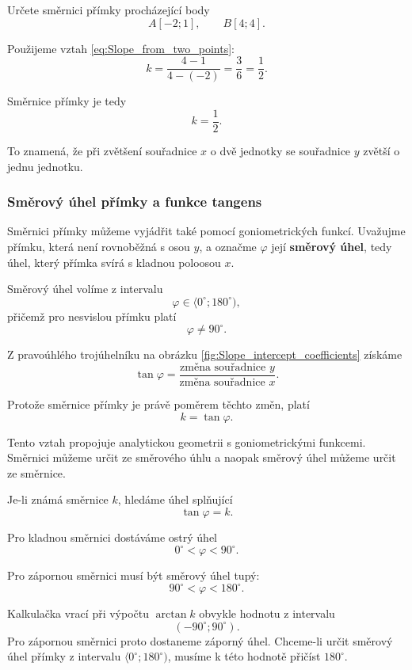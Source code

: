 \begin{example}\label{exa:Slope_from_two_points}
    Určete směrnici přímky procházející body
    \[
        A[-2;1],
        \qquad
        B[4;4].
    \]

    Použijeme vztah \eqref{eq:Slope_from_two_points}:
    \[
        k
        =
        \frac{4-1}{4-(-2)}
        =
        \frac{3}{6}
        =
        \frac{1}{2}.
    \]

    Směrnice přímky je tedy
    \[
        k=\frac{1}{2}.
    \]

    To znamená, že při zvětšení souřadnice $x$ o dvě jednotky se
    souřadnice $y$ zvětší o jednu jednotku.
\end{example}

\subsubsection{Směrový úhel přímky a funkce tangens}
\label{subsubsec:Slope_angle_tangent}

Směrnici přímky můžeme vyjádřit také pomocí goniometrických funkcí.
Uvažujme přímku, která není rovnoběžná s osou $y$, a označme
$\varphi$ její \textbf{směrový úhel}, tedy úhel, který přímka svírá
s kladnou poloosou $x$.

Směrový úhel volíme z intervalu
\[
    \varphi\in\langle 0^\circ;180^\circ),
\]
přičemž pro nesvislou přímku platí
\[
    \varphi\neq90^\circ.
\]

Z pravoúhlého trojúhelníku na obrázku
\ref{fig:Slope_intercept_coefficients} získáme
\[
    \tan\varphi
    =
    \frac{\text{změna souřadnice }y}
         {\text{změna souřadnice }x}.
\]

Protože směrnice přímky je právě poměrem těchto změn, platí
\begin{equation}\label{eq:Slope_tangent_relation}
    k=\tan\varphi.
\end{equation}

Tento vztah propojuje analytickou geometrii s goniometrickými funkcemi.
Směrnici můžeme určit ze směrového úhlu a naopak směrový úhel můžeme
určit ze směrnice.

Je-li známá směrnice $k$, hledáme úhel splňující
\[
    \tan\varphi=k.
\]

Pro kladnou směrnici dostáváme ostrý úhel
\[
    0^\circ<\varphi<90^\circ.
\]

Pro zápornou směrnici musí být směrový úhel tupý:
\[
    90^\circ<\varphi<180^\circ.
\]

\begin{remark}\label{rem:Arctangent_negative_slope}
    Kalkulačka vrací při výpočtu $\arctan k$ obvykle hodnotu
    z intervalu
    \[
        (-90^\circ;90^\circ).
    \]
    Pro zápornou směrnici proto dostaneme záporný úhel. Chceme-li
    určit směrový úhel přímky z intervalu
    $\langle0^\circ;180^\circ)$, musíme k této hodnotě přičíst
    $180^\circ$.
\end{remark}

